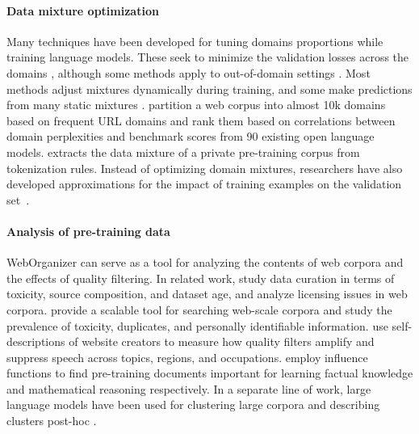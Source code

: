 \paragraph{Data mixture optimization}
Many techniques have been developed 
for tuning domains proportions
while training language models.
These seek to minimize the validation losses across the domains
\citep{xie2023doremi, albalak2023efficient, jiang2024adaptive, chen2024aioli}, 
although some methods apply to out-of-domain settings
\citep{chen2023skillit, fan2023doge}.
Most methods adjust mixtures dynamically during training, and some make predictions from many static mixtures \citep{liu2024regmix, ye2024datamixinglaws, kang2024autoscale}.
\citet{trush2025improving} partition a web corpus into almost 10k domains based on frequent URL domains and rank them based on correlations between domain perplexities and benchmark scores from 90 existing open language models. 
\citet{hayase2024data} extracts the data mixture of a private pre-training corpus from tokenization rules.
Instead of optimizing domain mixtures, researchers have also developed approximations for the impact of training examples on the validation set~\citep{engstrom2024dsdm, yu2024mates, wang2024greats}.

\vspace{-0.05in}
\paragraph{Analysis of pre-training data} 
WebOrganizer can serve as a tool for analyzing the contents of web corpora and the effects of quality filtering.
In related work, \citet{longpre2024pretrainers} study data curation in terms of toxicity, source composition, and dataset age, and
\citet{longpre2024consent} analyze licensing issues in web corpora.
\citet{elazar2024whats} provide a scalable tool for searching web-scale corpora and study the prevalence of toxicity, duplicates, and personally identifiable information.
\citet{lucy2024aboutme} use self-descriptions of website creators to measure how quality filters amplify and suppress speech across topics, regions, and occupations.
\citet{ruis2024procedural} employ influence functions to find pre-training documents important for learning factual knowledge and mathematical reasoning respectively.
In a separate line of work, large language models have been used for clustering large corpora \citep{wang2023goal, zhang2023clusterllm, pham2024topicgpt} and describing clusters post-hoc \citep{zhong22describing, tamkin2024clio}.
